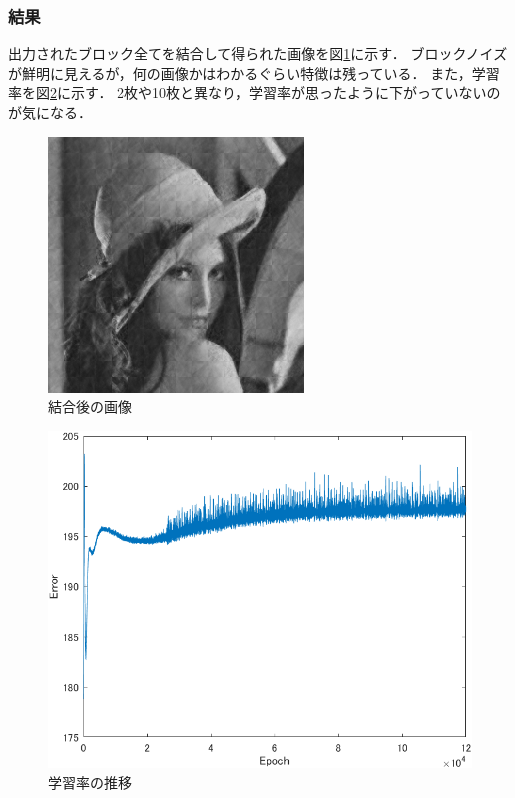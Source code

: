 \documentclass[twocolumn, a4j]{jsarticle}
\begin{document}
\subsubsection{結果}
出力されたブロック全てを結合して得られた画像を図\ref{fig:3-7}に示す．
ブロックノイズが鮮明に見えるが，何の画像かはわかるぐらい特徴は残っている．
また，学習率を図\ref{fig:3-8}に示す．
2枚や10枚と異なり，学習率が思ったように下がっていないのが気になる．
\begin{figure}[h]
  \begin{center}
    \includegraphics[width=0.9\columnwidth]{figure/output.bmp}
  \end{center}
  \caption{結合後の画像}
  \label{fig:3-7}
\end{figure}
\begin{figure}[h]
  \begin{center}
    \includegraphics[width=0.9\columnwidth]{figure/archive20241218-figure3.png}
  \end{center}
  \caption{学習率の推移}
  \label{fig:3-8}
\end{figure}
\end{document}
